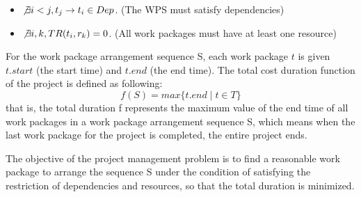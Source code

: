 \begin{itemize}
\item $\not \exists i < j, t_j \rightarrow t_i \in Dep$.
  (The WPS must satisfy dependencies)
\item $\not \exists i, k, TR(t_i, r_k) = 0$.
  (All work packages must have at least one resource)
\end{itemize}

For the work package arrangement sequence S,
each work package $t$ is given $t.start$ (the start time) and $t.end$ (the end time).
The total cost duration function of the project is defined as following:
\begin{equation}
f(S) = max\{t.end \mid t \in T\}
\end{equation}
that is, the total duration f represents the maximum value of the end time
of all work packages in a work package arrangement sequence S,
which means when the last work package for the project is completed, the entire project ends.

The objective of the project management problem is to find a reasonable work package
to arrange the sequence S under the condition of satisfying the restriction of dependencies and resources,
so that the total duration is minimized.

